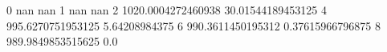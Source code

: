 0 nan nan
1 nan nan
2 1020.0004272460938 30.01544189453125
4 995.6270751953125 5.64208984375
6 990.3611450195312 0.37615966796875
8 989.9849853515625 0.0
